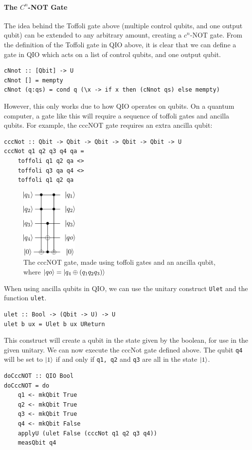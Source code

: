 \documentclass[a4paper,10pt, titlepage, twoside]{article}
\begin{document}
\paragraph{The $C^n$-NOT Gate}
The idea behind the Toffoli gate above (multiple control qubits, and one output qubit) can be extended to any arbitrary amount, creating a $c^n$-NOT gate. From the definition of the Toffoli gate in QIO above, it is clear that we can define a gate in QIO which acts on a list of control qubits, and one output qubit.
\begin{verbatim}
cNnot :: [Qbit] -> U
cNnot [] = mempty
cNnot (q:qs) = cond q (\x -> if x then (cNnot qs) else mempty)
\end{verbatim}
However, this only works due to how QIO operates on qubits. On a quantum computer, a gate like this will require a sequence of toffoli gates and ancilla qubits. For example, the cccNOT gate requires an extra ancilla qubit:
\begin{verbatim}
cccNot :: Qbit -> Qbit -> Qbit -> Qbit -> Qbit -> U
cccNot q1 q2 q3 q4 qa = 
    toffoli q1 q2 qa <>
    toffoli q3 qa q4 <>
    toffoli q1 q2 qa
\end{verbatim}
\begin{figure}[H]
	\centering
	\theverbbox\qquad
	\includegraphics[width=0.25\textwidth]{cccnot}
	\caption{The cccNOT gate, made using toffoli gates and an ancilla qubit, where $\ket{qo} = \ket{q_4 \oplus (q_1 q_2 q_3)}$}
\end{figure}
When using ancilla qubits in QIO, we can use the unitary construct \texttt{Ulet} and the function \texttt{ulet}.
\begin{verbatim}
ulet :: Bool -> (Qbit -> U) -> U
ulet b ux = Ulet b ux UReturn
\end{verbatim}
This construct will create a qubit in the state given by the boolean, for use in the given unitary. We can now execute the cccNot gate defined above. The qubit \texttt{q4} will be set to $\ket{1}$ if and only if \texttt{q1, q2} and \texttt{q3} are all in the state $\ket{1}$.
\begin{verbatim}
doCccNOT :: QIO Bool
doCccNOT = do
    q1 <- mkQbit True
    q2 <- mkQbit True
    q3 <- mkQbit True
    q4 <- mkQbit False
    applyU (ulet False (cccNot q1 q2 q3 q4))
    measQbit q4
\end{verbatim}
\end{document}

